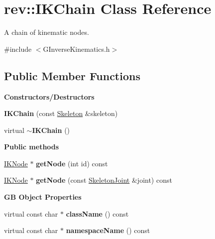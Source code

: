 \hypertarget{classrev_1_1_i_k_chain}{}\section{rev\+::I\+K\+Chain Class Reference}
\label{classrev_1_1_i_k_chain}


A chain of kinematic nodes.  




{\ttfamily \#include $<$G\+Inverse\+Kinematics.\+h$>$}

\subsection*{Public Member Functions}
\begin{Indent}\textbf{ Constructors/\+Destructors}\par
\begin{DoxyCompactItemize}
\item 
\mbox{\label{classrev_1_1_i_k_chain_a0e074088ed47dcb3044c3f011eaf8bd8}} 
{\bfseries I\+K\+Chain} (const \mbox{\hyperlink{classrev_1_1_skeleton}{Skeleton}} \&skeleton)
\item 
\mbox{\label{classrev_1_1_i_k_chain_a2ac0db1a59bcdec5c8ae35559eabd70c}} 
virtual {\bfseries $\sim$\+I\+K\+Chain} ()
\end{DoxyCompactItemize}
\end{Indent}
\begin{Indent}\textbf{ Public methods}\par
\begin{DoxyCompactItemize}
\item 
\mbox{\label{classrev_1_1_i_k_chain_a5293e0103295cdc867fab2fc13a1382a}} 
\mbox{\hyperlink{classrev_1_1_i_k_node}{I\+K\+Node}} $\ast$ {\bfseries get\+Node} (int id) const
\item 
\mbox{\label{classrev_1_1_i_k_chain_a555098857a8170fb54bf090c92f58306}} 
\mbox{\hyperlink{classrev_1_1_i_k_node}{I\+K\+Node}} $\ast$ {\bfseries get\+Node} (const \mbox{\hyperlink{classrev_1_1_skeleton_joint}{Skeleton\+Joint}} \&joint) const
\end{DoxyCompactItemize}
\end{Indent}
\begin{Indent}\textbf{ GB Object Properties}\par
\begin{DoxyCompactItemize}
\item 
\mbox{\label{classrev_1_1_i_k_chain_abe01ba38ded2dd08bf03a1f7a915d908}} 
virtual const char $\ast$ {\bfseries class\+Name} () const
\item 
\mbox{\label{classrev_1_1_i_k_chain_a3a5c03ae801e396bd620fef84082f6c7}} 
virtual const char $\ast$ {\bfseries namespace\+Name} () const
\end{DoxyCompactItemize}
\end{Indent}
